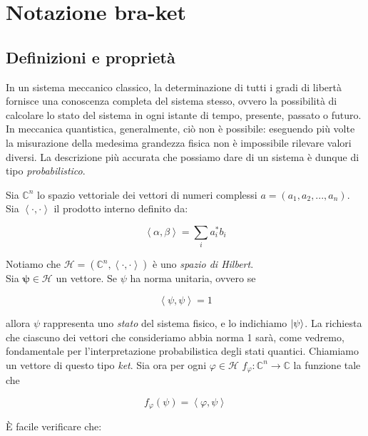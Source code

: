 \section{Notazione bra-ket}

\subsection{Definizioni e proprietà}

	In un sistema meccanico classico, la determinazione di tutti i gradi di libertà fornisce una conoscenza completa del sistema stesso, ovvero la possibilità di calcolare lo stato del sistema in ogni istante di tempo, presente, passato o futuro. In meccanica quantistica, generalmente, ciò non è possibile: eseguendo più volte la misurazione della medesima grandezza fisica non è impossibile rilevare valori diversi. La descrizione più accurata che possiamo dare di un sistema è dunque di tipo \textit{probabilistico}.

Sia $\mathbb{C}^n$ lo spazio vettoriale dei vettori di numeri complessi $a = (a_1, a_2, ..., a_n)$. Sia $\left \langle \cdot, \cdot \right \rangle$ il prodotto interno definito da:

	\begin{equation} \label{eq:innerProduct}
		\left \langle \alpha, \beta \right \rangle = \sum_{i} a_i^{*} b_i
	\end{equation}

Notiamo che $\mathcal{H}= (\mathbb{C}^n, \left \langle \cdot, \cdot \right \rangle)$ è uno \textit{spazio di Hilbert}. \\
Sia $\mathbf{\psi} \in \mathcal{H}$ un vettore. Se $\psi$ ha norma unitaria, ovvero se

	\[
		\left \langle \psi, \psi \right \rangle = 1
	\]

allora $\psi$ rappresenta uno \textit{stato} del sistema fisico, e lo indichiamo $\ket{\psi}$. La richiesta che ciascuno dei vettori che consideriamo abbia norma 1 sarà, come vedremo, fondamentale per l'interpretazione probabilistica degli stati quantici. Chiamiamo un vettore di questo tipo \textit{ket}. Sia ora per ogni $\varphi \in \mathcal{H}$ $f_{\varphi} : \mathbb{C}^n \rightarrow \mathbb{C}$ la funzione tale che 

	\begin{equation}
		f_{\varphi} (\psi) = \left \langle \varphi, \psi \right \rangle
	\end{equation}

È facile verificare che:


